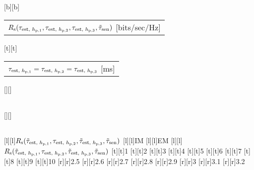 %    
%
%
%
[b][b]{\fontsize{8}{12}\selectfont \color[rgb]{0,0,0}\setlength{\tabcolsep}{0pt}\begin{tabular}{c}$R_{\text{s}}(\tau_{\text{est, $h_{\text{p,1}}$}},\tau_{\text{est, $h_{\text{p,2}}$}}, \tau_{\text{est, $h_{\text{p,3}}$}}, \tilde{\tau}_{\text{sen}})$ [bits/sec/Hz]\end{tabular}}%
[t][t]{\fontsize{8}{12}\selectfont \color[rgb]{0,0,0}\setlength{\tabcolsep}{0pt}\begin{tabular}{c}$\tau_{\text{est, $h_{\text{p,1}}$}} =\tau_{\text{est, $h_{\text{p,2}}$}} = \tau_{\text{est, $h_{\text{p,3}}$}}$  [ms]\end{tabular}}%
[][]{\fontsize{10}{15}\selectfont \color[rgb]{0,0,0}\setlength{\tabcolsep}{0pt}\begin{tabular}{c} \end{tabular}}%
[][]{\fontsize{10}{15}\selectfont \color[rgb]{0,0,0}\setlength{\tabcolsep}{0pt}\begin{tabular}{c} \end{tabular}}%
[l][l]{\fontsize{8}{12}\selectfont \color[rgb]{0,0,0}$R_{\text{s}}(\tilde{\tau}_{\text{est, $h_{\text{p,1}}$}}, \tau_{\text{est, $h_{\text{p,2}}$}}, \tilde{\tau}_{\text{est, $h_{\text{p,3}}$}}, \tilde{\tau}_{\text{sen}})$}%
[l][l]{\fontsize{8}{12}\selectfont \color[rgb]{0,0,0}IM}%
[l][l]{\fontsize{8}{12}\selectfont \color[rgb]{0,0,0}EM}%
[l][l]{\fontsize{8}{12}\selectfont \color[rgb]{0,0,0}$R_{\text{s}}(\tilde{\tau}_{\text{est, $h_{\text{p,1}}$}}, \tau_{\text{est, $h_{\text{p,2}}$}}, \tilde{\tau}_{\text{est, $h_{\text{p,3}}$}}, \tilde{\tau}_{\text{sen}})$}%
%
\fontsize{8}{12}%
\selectfont%
%
[t][t]{1}%
[t][t]{2}%
[t][t]{3}%
[t][t]{4}%
[t][t]{5}%
[t][t]{6}%
[t][t]{7}%
[t][t]{8}%
[t][t]{9}%
[t][t]{10}%
%
[r][r]{2.5}%
[r][r]{2.6}%
[r][r]{2.7}%
[r][r]{2.8}%
[r][r]{2.9}%
[r][r]{3}%
[r][r]{3.1}%
[r][r]{3.2}%
%
%
